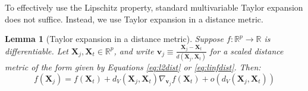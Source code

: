 \documentclass{article}
\newtheorem{lemma}[theorem]{Lemma}
\newcommand{\ddt}{\frac{d}{dt}}
\newcommand{\Xt}{\mathbf{X}_t}
\newcommand{\Xj}{\mathbf{X}_j}
\newcommand{\vj}{\mathbf{v}_j}
\newcommand{\R}{\mathbb{R}}
\newcommand{\Rp}{\mathbb{R}^p}
\begin{document}
To effectively use the Lipschitz property, standard multivariable Taylor expansion does not suffice.
Instead, we use Taylor expansion in a distance metric.

\begin{lemma}[Taylor expansion in a distance metric]
\label{lem:bias}
Suppose $f: \Rp \to \R$ is differentiable.
Let $\Xj, \Xt \in \Rp$, and write $\vj \equiv \frac{\Xj - \Xt}{d(\Xj, \Xt)}$ for a scaled distance metric of the form given by Equations \ref{eq:l2dist} or \ref{eq:linfdist}.
Then:
$$f(\Xj) = f(\Xt) + d_V(\Xj, \Xt) \nabla_{\vj} f(\Xt) + o(d_V(\Xj, \Xt))$$
\end{lemma}
\end{document}
